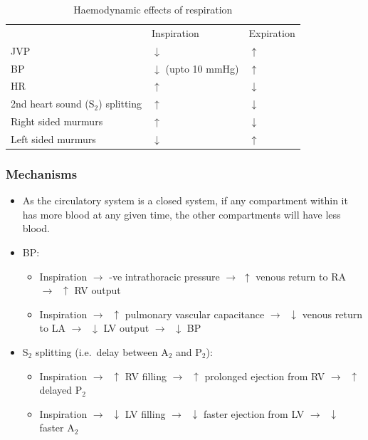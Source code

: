 \documentclass[
  12pt,
]{memoir}
\providecommand{\tightlist}{%
  \setlength{\itemsep}{0pt}\setlength{\parskip}{0pt}}
\begin{document}
\renewcommand{\arraystretch}{1.5}
\begin{table}[h!]
\centering
\begin{tabular}{l l l}
\cellcolor{violet!60}\color{white} &
\cellcolor{violet!60}\color{white}Inspiration &
\cellcolor{violet!60}\color{white}Expiration \\
JVP & $\downarrow$ & $\uparrow$ \\
BP & $\downarrow$ (upto 10 mmHg) & $\uparrow$ \\
HR & $\uparrow$ & $\downarrow$ \\
2nd heart sound (S$_2$) splitting & $\uparrow$ & $\downarrow$ \\
Right sided murmurs & $\uparrow$ & $\downarrow$ \\
Left sided murmurs & $\downarrow$ & $\uparrow$ \\
\end{tabular}
\vspace{3mm}\caption{Haemodynamic effects of respiration}
\label{table:haemo-resp}
\end{table}

\hypertarget{mechanisms}{%
\subsubsection{Mechanisms}\label{mechanisms}}

\begin{itemize}
\tightlist
\item
  As the circulatory system is a closed system, if any compartment
  within it has more blood at any given time, the other compartments
  will have less blood.
\item
  BP:

  \begin{itemize}
  \tightlist
  \item
    Inspiration \(\rightarrow\) -ve intrathoracic pressure
    \(\rightarrow\) \(\uparrow\) venous return to RA
    \(\rightarrow\;\;\uparrow\) RV output
  \item
    Inspiration \(\rightarrow\;\;\uparrow\) pulmonary vascular
    capacitance \(\rightarrow\;\;\downarrow\) venous return to LA
    \(\rightarrow\;\;  \downarrow\) LV output
    \(\rightarrow\;\;\downarrow\) BP
  \end{itemize}
\item
  S\(_2\) splitting (i.e.~delay between A\(_2\) and P\(_2\)):

  \begin{itemize}
  \tightlist
  \item
    Inspiration \(\rightarrow\;\;\uparrow\) RV filling
    \(\rightarrow\;\;  \uparrow\) prolonged ejection from RV
    \(\rightarrow\;\;\uparrow\) delayed P\(_2\)
  \item
    Inspiration \(\rightarrow\;\;\downarrow\) LV filling
    \(\rightarrow\;\;  \downarrow\) faster ejection from LV
    \(\rightarrow\;\;\downarrow\) faster A\(_2\)
  \end{itemize}
\end{itemize}
\end{document}
